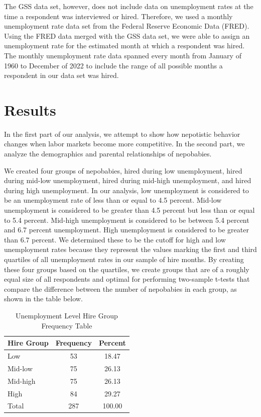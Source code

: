 \documentclass[12pt]{article}
\begin{document}
The GSS data set, however, does not include data on unemployment rates at the time a respondent was interviewed or hired. Therefore, we used a monthly unemployment rate data set from the Federal Reserve Economic Data (FRED). Using the FRED data merged with the GSS data set, we were able to assign an unemployment rate for the estimated month at which a respondent was hired. The monthly unemployment rate data spanned every month from January of 1960 to December of 2022 to include the range of all possible months a respondent in our data set was hired. 


\section{Results}
\label{sec:result}

In the first part of our analysis, we attempt to show how nepotistic behavior changes when labor markets become more competitive. In the second part, we analyze the demographics and parental relationships of nepobabies.


We created four groups of nepobabies, hired during low unemployment, hired during mid-low unemployment, hired during mid-high unemployment, and hired during high unemployment. In our analysis, low unemployment is considered to be an unemployment rate of less than or equal to 4.5 percent. Mid-low unemployment is considered to be greater than 4.5 percent but less than or equal to 5.4 percent. Mid-high unemployment is considered to be between 5.4 percent and 6.7 percent unemployment. High unemployment is considered to be greater than 6.7 percent. We determined these to be the cutoff for high and low unemployment rates because they represent the values marking the first and third quartiles of all unemployment rates in our sample of hire months. By creating these four groups based on the quartiles, we create groups that are of a roughly equal size of all respondents and optimal for performing two-sample t-tests that compare the difference between the number of nepobabies in each group, as shown in the table below.

\begin{table}[ht]
\centering
\begin{tabular}{l|cc}
Hire Group & Frequency & Percent \\
\hline 
Low & 53 & 18.47 \\
Mid-low & 75 & 26.13 \\
Mid-high & 75 & 26.13 \\
High & 84 & 29.27 \\
\hline 
Total & 287 & 100.00
\end{tabular}
\caption{Unemployment Level Hire Group Frequency Table}
\label{tab:mytable}
\end{table}
\end{document}

